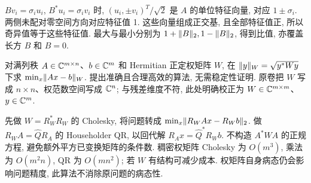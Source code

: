 \begin{solution}
$Bv_i=\sigma_i u_i$, $B^*u_i=\sigma_i v_i$ 时, $(u_i,\pm v_i)^T/\sqrt2$ 是 $A$ 的单位特征向量, 对应 $1\pm\sigma_i$. 两侧未配对零空间方向对应特征值 1. 这些向量组成正交基, 且全部特征值正, 所以奇异值等于这些特征值. 最大与最小分别为 $1+\lVert B\rVert_2,1-\lVert B\rVert_2$, 得到比值, 亦覆盖长方 $B$ 和 $B=0$.
\end{solution}
\begin{exercise}\label{e2008:q6}
对满列秩 $A\in\mathbb C^{m\times n}$、$b\in\mathbb C^m$ 和 Hermitian 正定权矩阵 $W$, 在 $\lVert y\rVert_W=\sqrt{y^*Wy}$ 下求 $\min_x\lVert Ax-b\rVert_W$. 提出准确且合理高效的算法, 无需稳定性证明. 原卷把 $W$ 写成 $n\times n$、权范数空间写成 $\mathbb C^n$; 与残差维度不符, 此处明确校正为 $W\in\mathbb C^{m\times m}$、$y\in\mathbb C^m$.
\end{exercise}
\begin{solution}
先做 $W=R_W^*R_W$ 的 Cholesky, 将问题转成 $\min_x\lVert R_WAx-R_Wb\rVert_2$. 做 $R_WA=\widehat QR_A$ 的 Householder QR, 以回代解 $R_Ax=\widehat Q^*R_Wb$. 不构造 $A^*WA$ 的正规方程, 避免额外平方已变换矩阵的条件数. 稠密权矩阵 Cholesky 为 $O(m^3)$, 乘法为 $O(m^2n)$, QR 为 $O(mn^2)$; 若 $W$ 有结构可减少成本. 权矩阵自身病态仍会影响问题精度, 此算法不消除原问题的病态性.
\end{solution}
